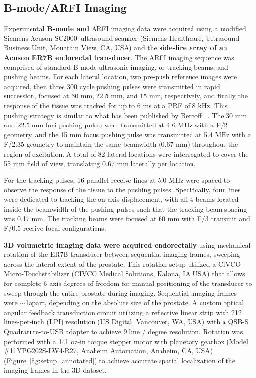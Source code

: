 \subsection{B-mode/ARFI Imaging}
Experimental \textbf{B-mode and} ARFI imaging data were acquired using a modified Siemens Acuson
SC2000\texttrademark~ultrasound scanner (Siemens Healthcare, Ultrasound Business Unit,
Mountain View, CA, USA) and the \textbf{side-fire array of an Acuson ER7B
endorectal transducer}.  The ARFI imaging sequence was comprised of
standard B-mode ultrasonic imaging, or tracking beams, and pushing beams. For
each lateral location, two pre-push reference images were acquired, then three
300 cycle pushing pulses were transmitted in rapid succession, focused at 30
mm, 22.5 mm, and 15 mm, respectively, and finally the response of the tissue
was tracked for up to 6 ms at a PRF of 8 kHz. This pushing strategy is similar to
what has been published by Bercoff \etal~\cite{Bercoff2004}. The 30 mm and 22.5
mm foci pushing pulses were transmitted at 4.6 MHz with a F/2 geometry, and the
15 mm focus pushing pulse was transmitted at 5.4 MHz with a F/2.35 geometry to
maintain the same beamwidth (0.67 mm) throughout the region of excitation. A
total of 82 lateral locations were interrogated to cover the 55 mm field of
view, translating 0.67 mm laterally per location.

For the tracking pulses, 16 parallel receive lines at 5.0 MHz were spaced to
observe the response of the tissue to the pushing pulses.  Specifically, four
lines were dedicated to tracking the on-axis displacement, with all 4 beams
located inside the beamwidth of the pushing pulses such that the tracking beam
spacing was 0.17 mm.  The tracking beams were focused at 60 mm with F/3
transmit and F/0.5 receive focal configurations.

\textbf{3D volumetric imaging data were acquired endorectally} using mechanical
rotation of the ER7B transducer between sequential imaging frames, sweeping
across the lateral extent of the prostate.  This rotation setup utilized a
CIVCO Micro-Touch\texttrademark stabilizer (CIVCO Medical Solutions, Kalona, IA
USA) that allows for complete 6-axis degrees of freedom for manual positioning
of the transducer to sweep through the entire prostate during imaging.
Sequential imaging frames were $\sim$1\degree apart, depending on the absolute
size of the prostate.  A custom optical angular feedback transduction circuit
utilizing a reflective linear strip with 212 lines-per-inch (LPI) resolution
(US Digital, Vancouver, WA, USA) with a QSB-S Quadrature-to-USB adapter to
achieve 9 line / degree resolution.  Rotation was performed with a 141 oz-in
torque stepper motor with planetary gearbox (Model \#11YPG202S-LW4-R27, Anaheim
Automation, Anaheim, CA, USA) (Figure~\ref{fig:setup_annotated}) to achieve
accurate spatial localization of the imaging frames in the 3D dataset.

